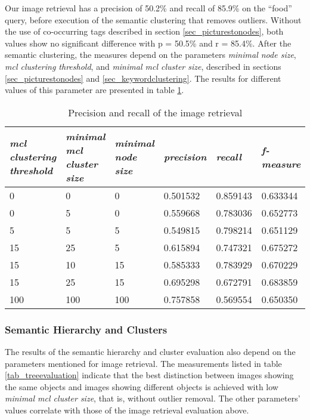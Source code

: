 Our image retrieval has a precision of 50.2\% and recall of 85.9\% on the ``food'' query, before execution of the semantic clustering that removes outliers. Without the use of co-occurring tags described in section \ref{sec_picturestonodes}, both values show no significant difference with p = 50.5\% and r = 85.4\%.
After the semantic clustering, the measures depend on the  parameters \emph{minimal node size}, \emph{mcl clustering threshold}, and \emph{minimal mcl cluster size}, described in sections \ref{sec_picturestonodes} and \ref{sec_keywordclustering}. The results for different values of this parameter are presented in table \ref{tab_retrievalevaluation}.\\

\begin{table}[h]
   \begin{tabular}{| p{2.2cm}| p{2.2cm}| p{2cm} || p{2cm} | p{2cm} | p{2cm} |}
    \hline
    \emph{mcl clustering threshold} & \emph{minimal mcl cluster size} & \emph{minimal node size} & \emph{precision} & \emph{recall} & \emph{f-measure} \\ \hline
    0 	& 0 	& 0 & 0.501532 & 0.859143 & 0.633344 \\ \hline
    0 	& 5 	& 0 & 0.559668 & 0.783036 & 0.652773 \\ \hline
    5 	& 5 	& 5 & 0.549815 & 0.798214 & 0.651129 \\ \hline     
    15 	& 25 &  5 & 0.615894 & 0.747321 & 0.675272 \\ \hline
    15 	& 10 & 15 & 0.585333 & 0.783929 & 0.670229 \\ \hline
    15 	& 25 & 15 & 0.695298 & 0.672791 & 0.683859 \\ \hline
    	100 	& 100 & 100 & 0.757858 & 0.569554 & 0.650350 \\ \hline
    \end{tabular}
    \caption{Precision and recall of the image retrieval}
	\label{tab_retrievalevaluation}
\end{table}


\subsubsection*{Semantic Hierarchy and Clusters}

The results of the semantic hierarchy and cluster evaluation also depend on the parameters mentioned for image retrieval. The measurements listed in table \ref{tab_treeevaluation} indicate that the best distinction between images showing the same objects and images showing different objects is achieved with low \emph{minimal mcl cluster size}, that is, without outlier removal. The other parameters' values correlate with those of the image retrieval evaluation above.\\

